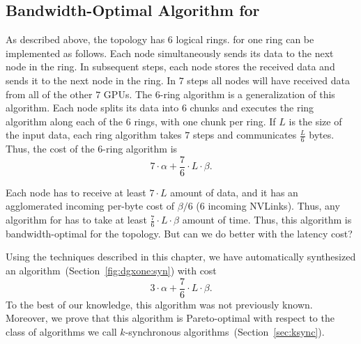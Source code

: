 
\subsection{Bandwidth-Optimal Algorithm for \dgxone}
\label{sec:motivation:bw-optimal}
As described above, the \dgxone topology has $6$ logical rings.
\allgather for one ring can be implemented as follows. Each node
simultaneously sends its data to the next node in the ring. In
subsequent steps, each node stores the received data and sends it to
the next node in the ring. In $7$ steps all nodes will have received
data from all of the other $7$ GPUs. The $6$-ring algorithm is a
generalization of this algorithm. Each node splits its data into $6$
chunks and executes the ring algorithm along each of the $6$ rings,
with one chunk per ring. If $L$ is the size of the input data, each
ring algorithm takes $7$ steps and communicates $\frac{L}{6}$ bytes.
Thus, the cost of the $6$-ring algorithm is
$$7\cdot \alpha + \frac{7}{6}\cdot L \cdot \beta.$$

Each node has to receive at least $7 \cdot L$ amount of data, and it
has an agglomerated incoming per-byte cost of $\beta/6$ (6 incoming
NVLinks). Thus, any algorithm for \allgather has to take at least
$\frac{7}{6}\cdot L \cdot \beta$ amount of time. Thus, this algorithm
is bandwidth-optimal for the \dgxone topology. But can we do better
with the latency cost?

Using the techniques described in this chapter, we have automatically
synthesized an algorithm~(Section~\ref{fig:dgxone:syn}) with cost
$$3\cdot \alpha + \frac{7}{6}\cdot L \cdot \beta.$$
%
To the best of our knowledge, this algorithm was not previously known.
Moreover, we prove that this algorithm is Pareto-optimal with respect
to the class of algorithms we call $k$-synchronous
algorithms~(Section~\ref{sec:ksync}).

